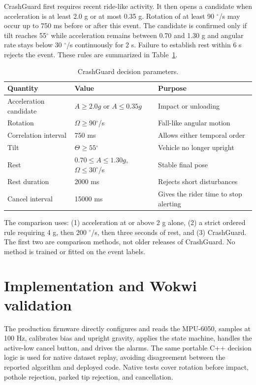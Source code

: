 \documentclass[12pt,a4paper]{article}
\newcommand{\degree}{\ensuremath{^{\circ}}}
\begin{document}
CrashGuard first requires recent ride-like activity. It then opens a
candidate when acceleration is at least 2.0 g or at most 0.35 g. Rotation of
at least 90 $\degree$/s may occur up to 750 ms before or after this event.
The candidate is confirmed only if tilt reaches 55$\degree$ while acceleration
remains between 0.70 and 1.30 g and angular rate stays below 30 $\degree$/s
continuously for 2 s. Failure to establish rest within 6 s rejects the event.
These rules are summarized in Table~\ref{tab:parameters}.

\begin{table}[H]
\centering
\small
\caption{CrashGuard decision parameters.}
\label{tab:parameters}
\begin{tabular}{@{}lll@{}}
\toprule
Quantity & Value & Purpose \\
\midrule
Acceleration candidate & $A\geq2.0g$ or $A\leq0.35g$ & Impact or unloading \\
Rotation & $\Omega\geq90\degree$/s & Fall-like angular motion \\
Correlation interval & 750 ms & Allows either temporal order \\
Tilt & $\Theta\geq55\degree$ & Vehicle no longer upright \\
Rest & $0.70\leq A\leq1.30g$, $\Omega\leq30\degree$/s & Stable final pose \\
Rest duration & 2000 ms & Rejects short disturbances \\
Cancel interval & 15000 ms & Gives the rider time to stop alerting \\
\bottomrule
\end{tabular}
\end{table}

The comparison uses: (1) acceleration at or above 2 g alone, (2) a strict
ordered rule requiring 4 g, then 200 $\degree$/s, then three seconds of rest,
and (3) CrashGuard. The first two are comparison methods, not older releases
of CrashGuard. No method is trained or fitted on the event labels.

\section{Implementation and Wokwi validation}

The production firmware directly configures and reads the MPU-6050, samples
at 100 Hz, calibrates bias and upright gravity, applies the state machine,
handles the active-low cancel button, and drives the alarms. The same portable
C++ decision logic is used for native dataset replay, avoiding disagreement
between the reported algorithm and deployed code. Native tests cover rotation
before impact, pothole rejection, parked tip rejection, and cancellation.
\end{document}
